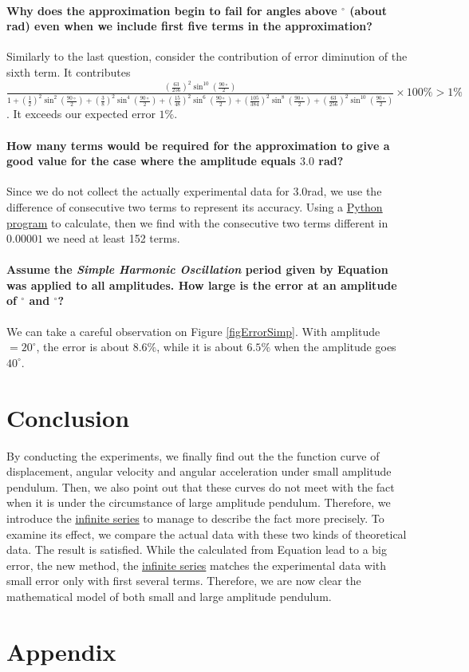 \paragraph{Why does the approximation begin to fail for angles above $^\circ$ (about rad) even when we include first five terms in the approximation?}
Similarly to the last question, consider the contribution of error diminution of the sixth term. It contributes \linebreak $\frac{(\frac{63}{256})^2\sin^{10}(\frac{90\circ}{2})}{1+(\frac{1}{2})^2\sin^2({\frac{90\circ}{2}})+({\frac{3}{8}})^2\sin^4({\frac{90\circ}{2}})+({\frac{15}{48}})^2\sin^6({\frac{90\circ}{2}})+({\frac{105}{384}})^2\sin^8({\frac{90\circ}{2}})+(\frac{63}{256})^2\sin^{10}(\frac{90\circ}{2})}\times100\%>1\%$. It exceeds our expected error $1\%$.

\paragraph{How many terms would be required for the approximation to give a good value for the case where the amplitude equals $3.0$ rad?}
Since we do not collect the actually experimental data for $3.0$rad, we use the difference of consecutive two terms to represent its accuracy. Using a \hyperref[Python]{Python program} to calculate, then we find with the consecutive two terms different in $0.00001$ we need at least 152 terms.

\paragraph{Assume the \emph{Simple Harmonic Oscillation} period given by Equation  was applied to all amplitudes. How large is the error at an amplitude of $^\circ$ and $^\circ$?}
We can take a careful observation on Figure \ref{figErrorSimp}. With amplitude$=20^\circ$, the error is about $8.6\%$, while it is about $6.5\%$ when the amplitude goes $40^\circ$.

\section{Conclusion}
By conducting the experiments, we finally find out the the function curve of displacement, angular velocity and angular acceleration under small amplitude pendulum. Then, we also point out that these curves do not meet with the fact when it is under the circumstance of large amplitude pendulum. Therefore, we introduce the \hyperref[eq:5]{infinite series} to manage to describe the fact more precisely. To examine its effect, we compare the actual data with these two kinds of theoretical data. The result is satisfied. While the calculated from Equation  lead to a big error, the new method, the \hyperref[eq:5]{infinite series} matches the experimental data with small error only with first several terms. Therefore, we are now clear the mathematical model of both small and large amplitude pendulum.
\pagebreak

\section*{Appendix}




